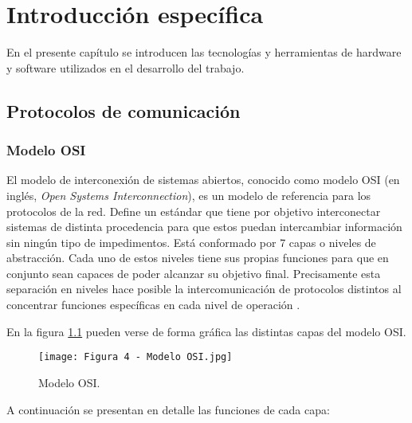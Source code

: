 \chapter{Introducción específica} %

\label{Chapter2}

En el presente capítulo se introducen las tecnologías y herramientas de hardware y software utilizados en el desarrollo del trabajo. 

\section{Protocolos de comunicación}
\subsection{Modelo OSI}

El modelo de interconexión de sistemas abiertos, conocido como modelo OSI (en inglés, \textit{Open Systems Interconnection}), es un modelo de referencia para los protocolos de la red. Define un estándar que tiene por objetivo interconectar sistemas de distinta procedencia para que estos puedan intercambiar información sin ningún tipo de impedimentos. Está conformado por 7 capas o niveles de abstracción. Cada uno de estos niveles tiene sus propias funciones para que en conjunto sean capaces de poder alcanzar su objetivo final. Precisamente esta separación en niveles hace posible la intercomunicación de protocolos distintos al concentrar funciones específicas en cada nivel de operación \citep{8}.

En la figura \ref{fig:5} pueden verse de forma gráfica las distintas capas del modelo OSI.

\begin{figure}[h]
\centering
\texttt{[image: Figura 4 - Modelo OSI.jpg]}
\caption[Modelo OSI]{Modelo OSI. \footnotemark}
\label{fig:5}
\end{figure}

A continuación se presentan en detalle las funciones de cada capa:

